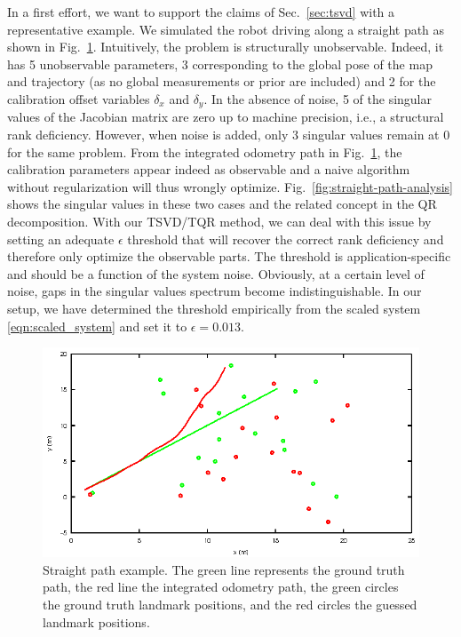 In a first effort, we want to support the claims of Sec.~\ref{sec:tsvd} with
a representative example. We simulated the robot driving along a straight
path as shown in Fig.~\ref{fig:straight-path}. Intuitively, the problem is
structurally unobservable. Indeed, it has 5 unobservable parameters, 3
corresponding to the global pose of the map and trajectory (as no global
measurements or prior are included) and 2 for the calibration offset variables
$\delta_x$ and $\delta_y$. In the absence of noise, 5 of the singular values of
the Jacobian matrix are zero up to machine precision, i.e., a structural rank
deficiency. However, when noise is added, only 3 singular values remain at $0$
for the same problem. From the integrated odometry path in
Fig.~\ref{fig:straight-path}, the calibration parameters appear indeed as
observable and a naive algorithm without regularization will thus wrongly
optimize. Fig.~\ref{fig:straight-path-analysis} shows the singular values in
these two cases and the related concept in the QR decomposition. With our
TSVD/TQR method, we can deal with this issue by setting an adequate $\epsilon$
threshold that will recover the correct rank deficiency and therefore only
optimize the observable parts. The threshold is application-specific and should
be a function of the system noise. Obviously, at a certain level of noise, gaps
in the singular values spectrum become indistinguishable. In our setup, we have
determined the threshold empirically from the scaled system
\eqref{eqn:scaled_system} and set it to $\epsilon=0.013$.

\begin{figure}[t]
\centering
\includegraphics[]{fig/straight-path.eps}
\caption{Straight path example. The green line represents the ground truth path,
  the red line the integrated odometry path, the green circles the ground truth
  landmark positions, and the red circles the guessed landmark positions.}
\label{fig:straight-path}
\end{figure}

